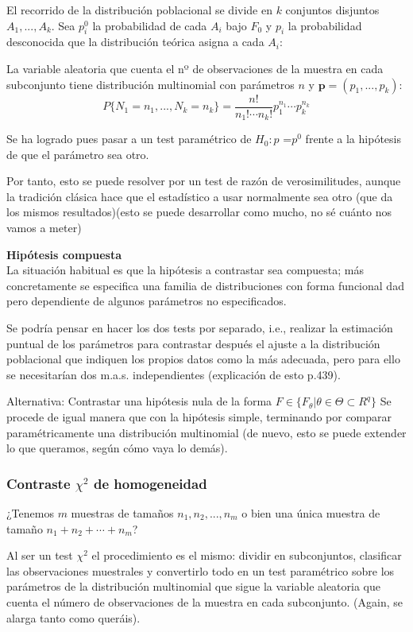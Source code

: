 \documentclass[a4paper,12pt]{article}
\begin{document}
El recorrido de la distribución poblacional se divide en $k$ conjuntos disjuntos $A_1,...,A_k$. Sea $p^0_i$ la probabilidad de cada $A_i$ bajo $F_0$ y $p_i$ la probabilidad desconocida que la distribución teórica asigna a cada $A_i$:

La variable aleatoria que cuenta el nº de observaciones de la muestra en cada subconjunto tiene distribución multinomial con parámetros $n$ y $\textbf{p}= (p_1,...,p_k)$:
$$P\{N_1=n_1,...,N_k=n_k\}= \frac{n!}{n_1!\cdots n_k!} p^{n_1}_1\cdots p^{n_k}_k$$

Se ha logrado pues pasar a un test paramétrico de $H_0: $\textbf{$p$} =\textbf{$p^0$} frente a la hipótesis de que el parámetro sea otro.

Por tanto, esto se puede resolver por un test de razón de verosimilitudes, aunque la tradición clásica hace que el estadístico a usar normalmente sea otro (que da los mismos resultados)(esto se puede desarrollar como mucho, no sé cuánto nos vamos a meter)

\textbf{Hipótesis compuesta} \\
La situación habitual es que la hipótesis a contrastar sea compuesta; más concretamente se especifica una familia de distribuciones con forma funcional dad pero dependiente de algunos parámetros no especificados.

Se podría pensar en hacer los dos tests por separado, i.e., realizar la estimación puntual de los parámetros para contrastar después el ajuste a la distribución poblacional que indiquen los propios datos como la más adecuada, pero para ello se necesitarían dos m.a.s. independientes (explicación de esto p.439).

Alternativa: Contrastar una hipótesis nula de la forma $F \in \{F_\theta| \theta \in \Theta \subset R^q\}$
Se procede de igual manera que con la hipótesis simple, terminando por comparar paramétricamente una distribución multinomial (de nuevo, esto se puede extender lo que queramos, según cómo vaya lo demás).

\subsubsection{Contraste $\chi^2$ de homogeneidad}
¿Tenemos $m$ muestras de tamaños $n_1, n_2,...,n_m$ o bien una única muestra de tamaño $n_1+n_2+\cdots + n_m$?

Al ser un test $\chi ^2$ el procedimiento es el mismo: dividir en subconjuntos, clasificar las observaciones muestrales y convertirlo todo en un test paramétrico sobre los parámetros de la distribución multinomial que sigue la variable aleatoria que cuenta el número de observaciones de la muestra en cada subconjunto. (Again, se alarga tanto como queráis).
\end{document}
